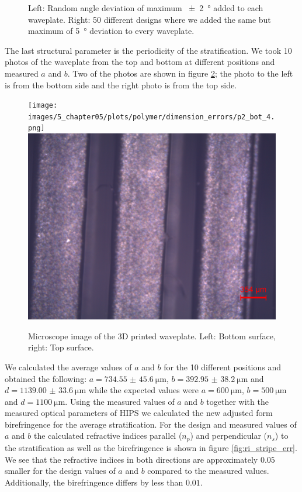 \begin{figure}[H]
    \centering
    
    \caption{Left: Random angle deviation of maximum \SI{\pm2}{\degree} added to each waveplate. Right: 50 different designs where we added the same but maximum of \SI{5}{\degree} deviation to every waveplate.}
    \label{fig:delta_angle_err}
\end{figure}

The last structural parameter is the periodicity of the stratification. We took 10 photos of the waveplate from the top and bottom at different positions and measured $a$ and $b$. Two of the photos are shown in figure \ref{fig:hips_wp_photos}; the photo to
the left is from the bottom side and the right photo is from the top side.

\begin{figure}[H]
\centering
    \subcaptionbox{\label{fig:p2bot4}}
        {\hspace*{-2em}\texttt{[image: images/5\_chapter05/plots/polymer/dimension\_errors/p2\_bot\_4.png]}}
    \qquad
    \subcaptionbox{\label{fig:p2top2}}
        {\hspace*{-2em}\includegraphics[width=0.47\linewidth]{images/5_chapter05/plots/polymer/dimension_errors/p2_top_2.png}}
    \caption{Microscope image of the 3D printed waveplate. Left: Bottom surface, right: Top surface.}
\label{fig:hips_wp_photos}
\end{figure}

We calculated the average values of $a$ and $b$ for the 10 different positions and obtained the following: $a=\SI[separate-uncertainty = true]{734.55(4560)}{\micro \meter}$, $b=\SI[separate-uncertainty = true]{392.95(3820)}{\micro \meter}$ and $d=\SI[separate-uncertainty = true]{1139.00(3360)}{\micro \meter}$ while the expected values were $a=\SI{600}{\micro \meter}$, $b=\SI{500}{\micro \meter}$ and $d=\SI{1100}{\micro \meter}$. Using the measured values of $a$ and $b$ together with the measured optical parameters of HIPS we calculated the new adjusted form birefringence for the average stratification. For the design and measured values of $a$ and $b$ the calculated refractive indices parallel ($n_p$) and perpendicular ($n_s$) to the stratification as well as the birefringence is shown in figure \ref{fig:ri_stripe_err}. We see that the refractive indices in both directions are approximately $0.05$ smaller for the design values of $a$ and $b$ compared to the measured values. Additionally, the birefringence differs by less than $0.01$.

